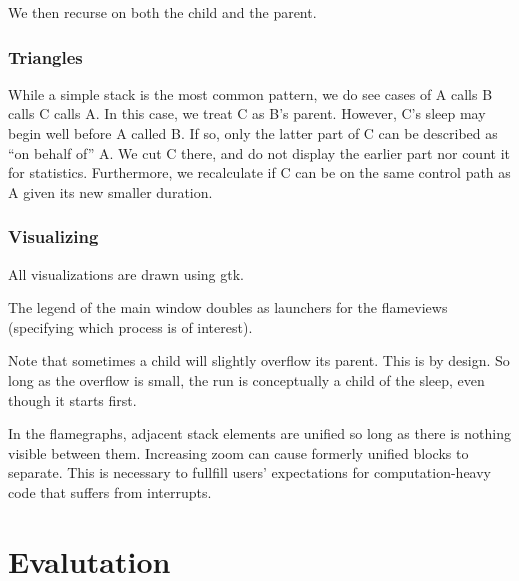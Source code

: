 \documentclass[10pt]{article}
\begin{document}
We then recurse on both the child and the parent. 

\subsubsection{Triangles}

While a simple stack is the most common pattern, we do see cases of A calls B calls C calls A.  In this case, we treat C as B's parent.  However, C's sleep may begin well before A called B.  If so, only the latter part of C can be described as ``on behalf of'' A.  We cut C there, and do not display the earlier part nor count it for statistics.  Furthermore, we recalculate if C can be on the same control path as A given its new smaller duration.

\subsubsection{Visualizing}

All visualizations are drawn using gtk.

The legend of the main window doubles as launchers for the flameviews (specifying which process is of interest).

Note that sometimes a child will slightly overflow its parent.  This is by design.  So long as the overflow is small, the run is conceptually a child of the sleep, even though it starts first.

In the flamegraphs, adjacent stack elements are unified so long as there is nothing visible between them.  Increasing zoom can cause formerly unified blocks to separate.  This is necessary to fullfill users' expectations for computation-heavy code that suffers from interrupts.

\section{Evalutation}
\end{document}
